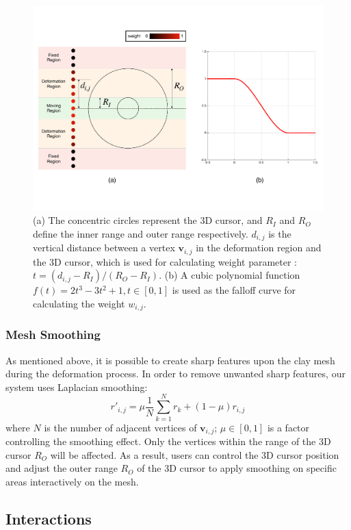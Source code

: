 \documentclass{svjour3}                     %
\begin{document}
\begin{figure}
\includegraphics[width=\textwidth]{fig8.pdf}
\caption{(a) The concentric circles represent the 3D cursor, and $R_{I}$ and $R_{O}$ define the inner range and outer range respectively. $d_{i,j}$ is the vertical distance between a vertex $\mathbf{v}_{i,j}$ in the deformation region and the 3D cursor, which is used for calculating weight parameter : $t = (d_{i,j} - R_{I}) / (R_{O} - R_{I})$. (b) A cubic polynomial function $f(t) = 2t^3 - 3t^2 + 1, t \in [0,1]$ is used as the falloff curve for calculating the weight $w_{i,j}$. }
\label{fig:deform}
\end{figure}

\subsubsection{Mesh Smoothing}
\label{sec:4.2.4}
As mentioned above, it is possible to create sharp features upon the clay mesh during the deformation process. In order to remove unwanted sharp features, our system uses Laplacian smoothing:
\begin{equation}
r'_{i,j} = 
\mu  \frac{1}{N} 
\sum_{k=1}^N r_{k}
+ (1 - \mu)  r_{i,j}
\end{equation}
where $N$ is the number of adjacent vertices of $\mathbf{v}_{i,j}$; $\mu \in [0,1]$ is a factor controlling the smoothing effect.
Only the vertices within the range of the 3D cursor $R_{O}$ will be affected.
As a result, users can control the 3D cursor position and adjust the outer range $R_{O}$ of the 3D cursor to apply smoothing on specific areas interactively on the mesh.

\subsection{Interactions}
\label{sec:4.3}
\end{document}
